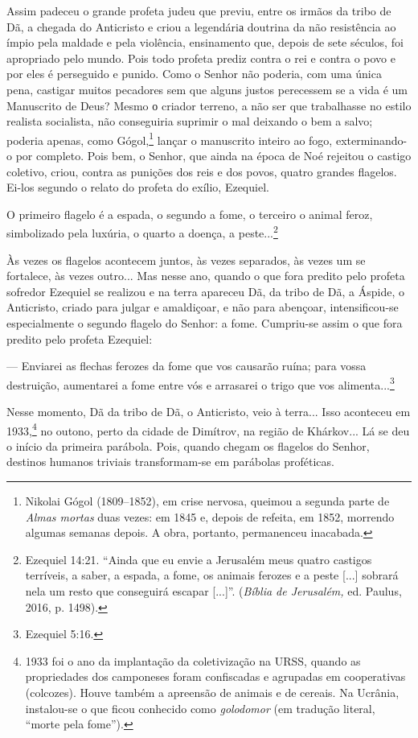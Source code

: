 Assim padeceu o grande profeta judeu que previu, entre os irmãos da
tribo de Dã, a chegada do Anticristo e criou a legendáriа doutrina da
não resistência ao ímpio pela maldade e pela violência, ensinamento que,
depois de sete séculos, foi apropriado pelo mundo. Pois todo profeta
prediz contra o rei e contra o povo e por eles é perseguido e punido.
Como o Senhor não poderia, com uma única pena, castigar muitos pecadores
sem que alguns justos perecessem se a vida é um Manuscrito de Deus?
Mesmo о criador terreno, a não ser que trabalhasse no estilo realista
socialista, não conseguiria suprimir o mal deixando o bem a salvo;
poderia apenas, como Gógol,\footnote{Nikolai Gógol (1809--1852), em
  crise nervosa, queimou a segunda parte de \emph{Almas mortas} duas
  vezes: em 1845 e, depois de refeita, em 1852, morrendo algumas semanas
  depois. A obra, portanto, permanenceu inacabada.} lançar o manuscrito
inteiro ao fogo, exterminando-o por completo. Pois bem, o Senhor, que
ainda na época de Noé rejeitou o castigo coletivo, criou, contra as
punições dos reis e dos povos, quatro grandes flagelos. Ei-los segundo o
relato do profeta do exílio, Ezequiel.

O primeiro flagelo é a espada, o segundo a fome, o terceiro o animal
feroz, simbolizado pela luxúria, o quarto a doença, a peste...\footnote{Ezequiel
  14:21. ``Ainda que eu envie a Jerusalém meus quatro castigos
  terríveis, a saber, a espada, a fome, os animais ferozes e a peste
  {[}...{]} sobrará nela um resto que conseguirá escapar {[}...{]}''.
  (\emph{Bíblia de Jerusalém,} ed. Paulus, 2016, p. 1498).}

Às vezes os flagelos acontecem juntos, às vezes separados, às vezes um
se fortalece, às vezes outro... Mas nesse ano, quando o que fora predito
pelo profeta sofredor Ezequiel se realizou e na terra apareceu Dã, da
tribo de Dã, a Áspide, o Anticristo, criado para julgar e amaldiçoar, e
não para abençoar, intensificou-se especialmente o segundo flagelo do
Senhor: a fome. Cumpriu-se assim o que fora predito pelo profeta
Ezequiel:

--- Enviarei as flechas ferozes da fome que vos causarão ruína; para
vossa destruição, aumentarei a fome entre vós e arrasarei o trigo que
vos alimenta...\footnote{Ezequiel 5:16.}

Nesse momento, Dã da tribo de Dã, o Anticristo, veio à terra... Isso
aconteceu em 1933,\footnote{1933 foi o ano da implantação da
  coletivização na URSS, quando as propriedades dos camponeses foram
  confiscadas e agrupadas em cooperativas (colcozes). Houve também a
  apreensão de animais e de cereais. Na Ucrânia, instalou-se o que ficou
  conhecido como \emph{golodomor} (em tradução literal, ``morte pela
  fome'').} no outono, perto da cidade de Dimítrov, na região de
Khárkov... Lá se deu o início da primeira parábola. Pois, quando chegam
os flagelos do Senhor, destinos humanos triviais transformam-se em
parábolas proféticas.

